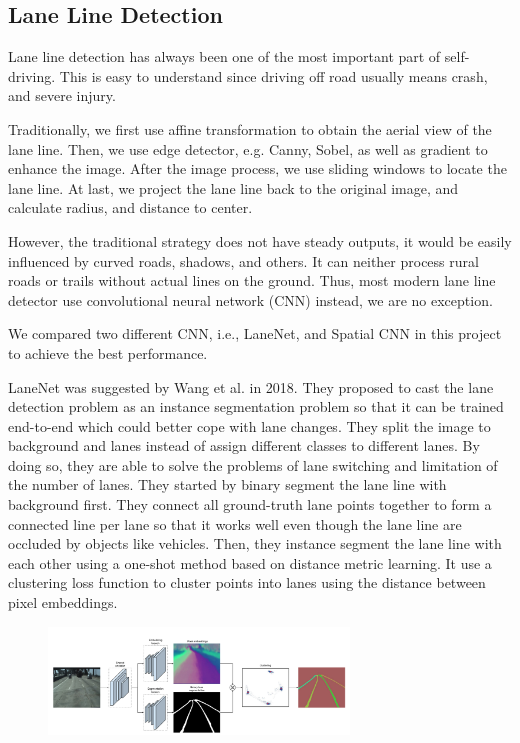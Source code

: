 \documentclass[runningheads]{llncs}
\begin{document}
\subsection{Lane Line Detection}
Lane line detection has always been one of the most 
important part of self-driving. This is easy to understand 
since driving off road usually means crash, and severe 
injury. 

Traditionally, we first use affine transformation to obtain 
the aerial view of the lane line. Then, we use edge 
detector, e.g. Canny, Sobel, as well as gradient to enhance 
the image. After the image process, we use sliding windows 
to locate the lane line. At last, we project the lane line 
back to the original image, and calculate radius, and 
distance to center. 

However, the traditional strategy does not have steady 
outputs, it would be easily influenced by curved roads, 
shadows, and others. It can neither process rural roads or 
trails without actual lines on the ground. Thus, most 
modern lane line detector use convolutional neural network 
(CNN) instead, we are no exception. 

We compared two different CNN, i.e., LaneNet, and 
Spatial CNN in this project to achieve the best performance. 

LaneNet was suggested by Wang et al.\cite{LaneNet} in 2018. 
They proposed to cast the lane detection problem as an 
instance segmentation problem so that it can be trained 
end-to-end which could better cope with lane changes. 
They split the image to background and lanes instead of 
assign different classes to different lanes. By doing so, 
they are able to solve the problems of lane switching and 
limitation of the number of lanes. They started by binary 
segment the lane line with background first. They connect 
all ground-truth lane points together to form a connected 
line per lane so that it works well even though the lane 
line are occluded by objects like vehicles. Then, they 
instance segment the lane line with each other using a 
one-shot method based on distance metric learning. It use a 
clustering loss function to cluster points into lanes using 
the distance between pixel embeddings. 
\begin{figure}
    \centering
    \includegraphics[width=8cm]{reference/lanenet}
    \label{fig:example}
\end{figure}
\end{document}
